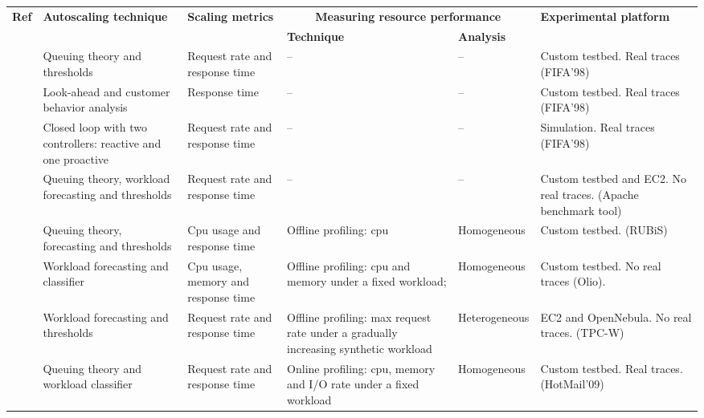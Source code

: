 \begin{table*}
  {\scriptsize 
    \begin{tabular}{  | p{0.8cm} | p{3.5cm} | p{3cm} | p{3.2cm} | p{1.4cm} | p{3.2cm} |}
    \hline
\textbf{Ref} & \textbf{Autoscaling technique}   & \textbf{Scaling metrics} & \multicolumn{2}{|c|}{\textbf{Measuring resource performance}}    & \textbf{Experimental platform} \\ 
 &   &    & \textbf{Technique} & \textbf{Analysis}  &  \\ \hline
\textit{\cite{urgaonkar_agile_2008}}   & Queuing theory and thresholds  & Request rate and response time &  --  & -- & Custom testbed. \newline Real traces (FIFA'98) \\ \hline
\textit{\cite{roy_efficient_2011}}   & Look-ahead and customer behavior analysis  & Response time &  --  & -- & Custom testbed. \newline Real traces (FIFA'98)  \\ \hline
\textit{\cite{ali-eldin_2012}}   & Closed loop with two controllers: reactive and one proactive   & Request rate and response time  & -- & -- & Simulation. \newline Real traces (FIFA'98)  \\ \hline
\textit{\cite{bunch_2012}}   & Queuing theory, workload forecasting and thresholds  & Request rate and response time  & -- &  --  & Custom testbed and EC2. \newline No real traces. (Apache benchmark tool)\\ \hline
\textit{\cite{roy_2011}}   & Queuing theory, forecasting and thresholds   &  Cpu usage and response time  & Offline profiling: cpu & Homogeneous &  Custom testbed. (RUBiS)  \\ \hline
\textit{\cite{smartscale_2012}}   &  Workload forecasting and classifier  &  Cpu usage, memory and response time & Offline profiling: cpu and memory under a fixed workload; & Homogeneous &  Custom  testbed. \newline No real traces (Olio).  \\ \hline
\textit{\cite{sharma_cost-aware_2011}}   & Workload forecasting and thresholds   & Request rate and response time  & Offline profiling: max request rate under a gradually increasing synthetic workload & Heterogeneous &  EC2 and OpenNebula. \newline No real traces. (TPC-W) \\ \hline
\textit{\cite{dejavu2012}}   & Queuing theory and workload classifier  &  Request rate and response time  & Online profiling: cpu, memory and I/O rate under a fixed workload & Homogeneous &  Custom testbed. \newline Real traces. (HotMail'09)  \\ \hline
 \end{tabular}

}
\end{table*}
